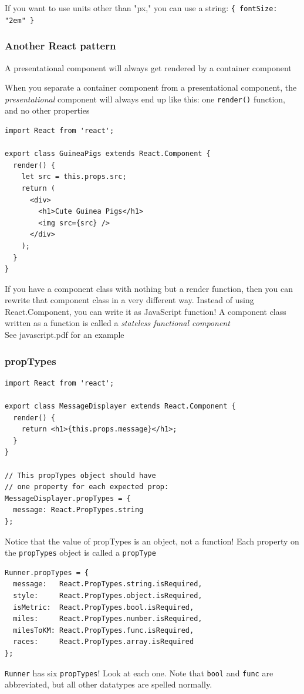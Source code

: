 \documentclass[a4paper, 12pt]{article}
\begin{document}
If you want to use units other than "px," you can use a string: \verb|{ fontSize: "2em" }|



\subsubsection{Another React pattern}
A presentational component will always get rendered by a container component

When you separate a container component from a presentational component, the \textit{presentational} component will always end up like this: one \verb|render()| function, and no other properties
\begin{verbatim}
import React from 'react';

export class GuineaPigs extends React.Component {
  render() {
    let src = this.props.src;
    return (
      <div>
        <h1>Cute Guinea Pigs</h1>
        <img src={src} />
      </div>
    );
  }
}
\end{verbatim}
If you have a component class with nothing but a render function, then you can rewrite that component class in a very different way. Instead of using React.Component, you can write it as JavaScript function! A component class written as a function is called a \textit{stateless functional component}\\
See javascript.pdf for an example

\subsubsection{propTypes}
\begin{verbatim}
import React from 'react';

export class MessageDisplayer extends React.Component {
  render() {
    return <h1>{this.props.message}</h1>;
  }
}

// This propTypes object should have
// one property for each expected prop:
MessageDisplayer.propTypes = {
  message: React.PropTypes.string
};
\end{verbatim}
Notice that the value of propTypes is an object, not a function! Each property on the \verb|propTypes| object is called a \verb|propType|

\begin{verbatim}
Runner.propTypes = {
  message:   React.PropTypes.string.isRequired,
  style:     React.PropTypes.object.isRequired,
  isMetric:  React.PropTypes.bool.isRequired,
  miles:     React.PropTypes.number.isRequired,
  milesToKM: React.PropTypes.func.isRequired,
  races:     React.PropTypes.array.isRequired
};
\end{verbatim}
\verb|Runner| has six \verb|propTypes|! Look at each one. Note that \verb|bool| and \verb|func| are abbreviated, but all other datatypes are spelled normally.
\end{document}
